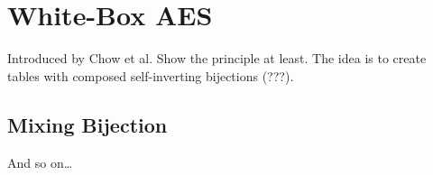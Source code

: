 \section{White-Box AES}
\label{sec:wbaes}

Introduced by Chow et al. Show the principle at least. The idea is to create tables with composed self-inverting bijections (???).

\subsection{Mixing Bijection}
	
	And so on\ldots
